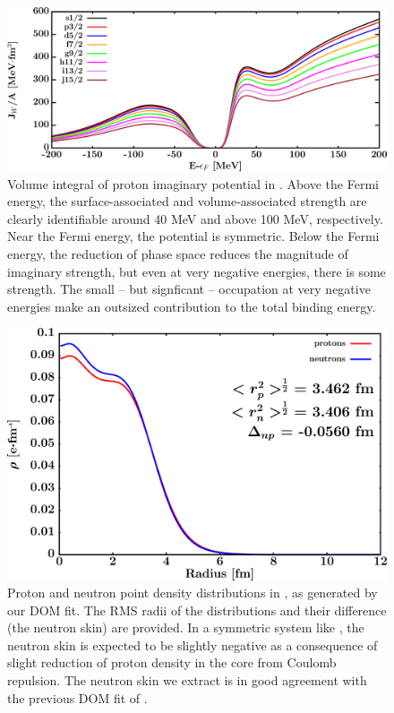 \begin{figure}[tb]
    \centering
    \includegraphics[width=\textwidth]{figures/ca40_protonVolumeIntegrals.png}
    \caption[Volume integral of proton imaginary potential in \caForty]
    {
        Volume integral of proton imaginary potential in \caForty. Above the
        Fermi energy, the surface-associated and volume-associated strength
        are clearly identifiable around 40 MeV and above 100 MeV,
        respectively. Near the Fermi energy, the potential is symmetric.
        Below the Fermi energy, the reduction of phase space reduces the
        magnitude of imaginary strength, but even at very negative energies,
        there is some strength. The small -- but signficant -- occupation at
        very negative energies make an outsized contribution to the total
        binding energy.
    }
    \label{Ca40ProtonVolumeIntegral}
\end{figure}

\begin{figure}[tb]
    \centering
    \includegraphics[width=\textwidth]{figures/ca40_matterDensity.png}
    \caption[Proton and neutron matter density distributions in \caForty]
    {
        Proton and neutron point density distributions in \caForty, as
        generated by our DOM fit. The RMS radii of the distributions and their
        difference (the neutron skin) are provided. In a symmetric system like
        \caForty, the neutron skin is expected to be slightly negative as a
        consequence of slight reduction of proton density in the core from
        Coulomb repulsion. The neutron skin we extract is in good agreement with
        the previous DOM fit of \cite{MahzoonPhDThesis}.
    }
    \label{Ca40MatterDistribution}
\end{figure}

